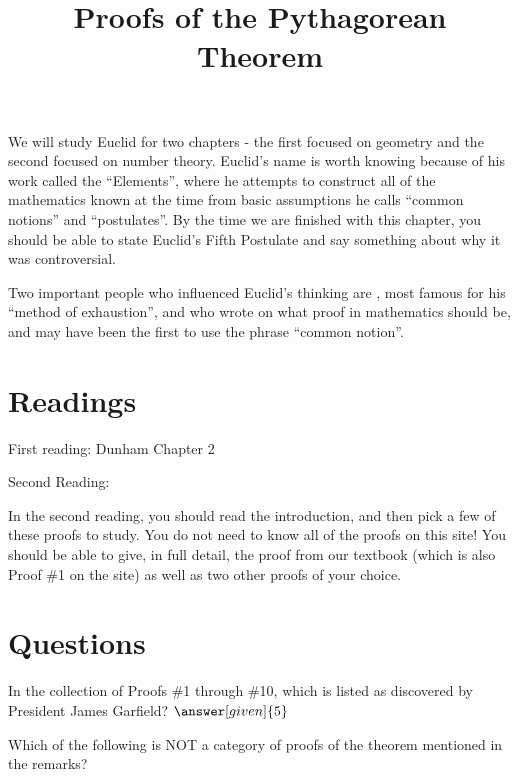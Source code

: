\documentclass[nooutcomes]{ximera}
\title{Proofs of the Pythagorean Theorem}
\begin{document}
\begin{abstract}
    
\end{abstract}
\maketitle


We will study Euclid for two chapters - the first focused on geometry and the second focused on number theory.  Euclid's name is worth knowing because of his work called the ``Elements'', where he attempts to construct all of the mathematics known at the time from basic assumptions he calls ``common notions'' and ``postulates''.  By the time we are finished with this chapter, you should be able to state Euclid's Fifth Postulate and say something about why it was controversial.  

Two important people who influenced Euclid's thinking are , most famous for his ``method of exhaustion'', and  who wrote on what proof in mathematics should be, and may have been the first to use the phrase ``common notion''.


\section{Readings}
First reading: Dunham Chapter 2

Second Reading: 
  

In the second reading, you should read the introduction, and then pick a few of these proofs to study.  You do not need to know all of the proofs on this site!  You should be able to give, in full detail, the proof from our textbook (which is also Proof \#1 on the site) as well as two other proofs of your choice.


\section{Questions}

\begin{question}
In the collection of Proofs \#1 through \#10, which is listed as discovered by President James Garfield?
$\answer[given]{5}$
\end{question}

\begin{question}
Which of the following is NOT a category of proofs of the theorem mentioned in the remarks?
\begin{multipleChoice}
\end{multipleChoice}
\end{question}

%
%
\end{document}
